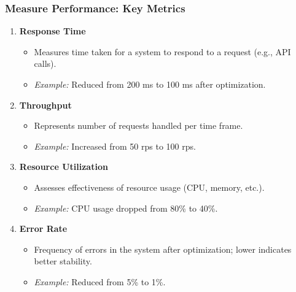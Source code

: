 \documentclass[aspectratio=169]{beamer}
\begin{document}
\begin{frame}[fragile]
    \frametitle{Measure Performance: Key Metrics}
    \begin{enumerate}
        \item \textbf{Response Time}
            \begin{itemize}
                \item Measures time taken for a system to respond to a request (e.g., API calls).
                \item \textit{Example:} Reduced from 200 ms to 100 ms after optimization.
            \end{itemize}
        
        \item \textbf{Throughput}
            \begin{itemize}
                \item Represents number of requests handled per time frame.
                \item \textit{Example:} Increased from 50 rps to 100 rps.
            \end{itemize}

        \item \textbf{Resource Utilization}
            \begin{itemize}
                \item Assesses effectiveness of resource usage (CPU, memory, etc.).
                \item \textit{Example:} CPU usage dropped from 80\% to 40\%.
            \end{itemize}

        \item \textbf{Error Rate}
            \begin{itemize}
                \item Frequency of errors in the system after optimization; lower indicates better stability.
                \item \textit{Example:} Reduced from 5\% to 1\%.
            \end{itemize}
    \end{enumerate}
\end{frame}
\end{document}
